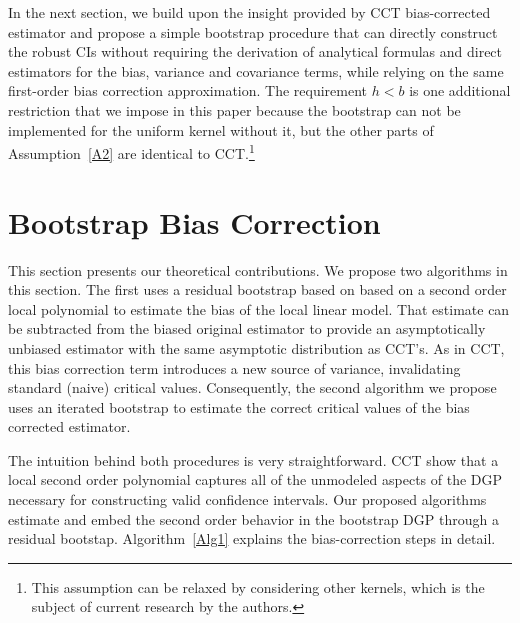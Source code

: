 \documentclass[12pt,fleqn]{article}
\begin{document}
In the next section, we build upon the insight provided by CCT bias-corrected
estimator and propose a simple bootstrap procedure that can directly construct
the robust CIs without requiring the derivation of analytical formulas and
direct estimators for the bias, variance and covariance terms, while relying on
the same first-order bias correction approximation. The requirement $h < b$ is
one additional restriction that we impose in this paper because the bootstrap
can not be implemented for the uniform kernel without it, but the other parts of
Assumption~\ref{A2} are identical to CCT.\footnote{%
  This assumption can be relaxed by considering other kernels, which is the
  subject of current research by the authors.} %

\section{Bootstrap Bias Correction}\label{boot}

This section presents our theoretical contributions. We propose two algorithms
in this section. The first uses a residual bootstrap based on based on a second
order local polynomial to estimate the bias of the local linear model. That
estimate can be subtracted from the biased original estimator to provide an
asymptotically unbiased estimator with the same asymptotic distribution as
CCT's. As in CCT, this bias correction term introduces a new source of variance,
invalidating standard (naive) critical values. Consequently, the second
algorithm we propose uses an iterated bootstrap to estimate the correct
critical values of the bias corrected estimator.

The intuition behind both procedures is very straightforward. CCT show that a
local second order polynomial captures all of the unmodeled aspects of the DGP
necessary for constructing valid confidence intervals. Our proposed algorithms
estimate and embed the second order behavior in the bootstrap DGP through
a residual bootstap.
Algorithm~\ref{Alg1} explains the bias-correction steps in detail.
\end{document}
